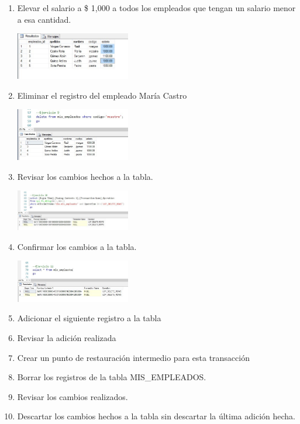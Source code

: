 \begin{enumerate}[1.]
\begin{center}
	\end{center}
	\item Elevar el salario a \$ 1,000 a todos los empleados que tengan un salario menor a esa cantidad.
	\begin{center}
	\includegraphics[width=5cm]{./Imagenes/img8} 
	\end{center}
	\item Eliminar el registro del empleado María Castro
	\begin{center}
	\includegraphics[width=5cm]{./Imagenes/img9} 
	\end{center}
	\item Revisar los cambios hechos a la tabla.
	\begin{center}
	\includegraphics[width=5cm]{./Imagenes/img10} 
	\end{center}
	\item Confirmar los cambios a la tabla.
	\begin{center}
	\includegraphics[width=5cm]{./Imagenes/img11} 
	\end{center}
	\item Adicionar el siguiente registro a la tabla
	\item Revisar la adición realizada
	\item Crear un punto de restauración intermedio para esta transacción
	\item Borrar los registros de la tabla MIS\_EMPLEADOS.
	\item Revisar los cambios realizados.
	\item Descartar los cambios hechos a la tabla sin descartar la última adición hecha.

\end{enumerate}
